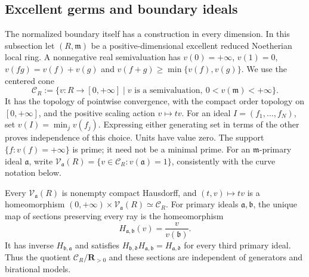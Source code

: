 \subsection{Excellent germs and boundary ideals}
\label{sec:local-excellent-boundary-links}

The normalized boundary itself has a construction in every dimension.
In this subsection let $(R,\mathfrak m)$ be a positive-dimensional
excellent reduced Noetherian local ring. A nonnegative real semivaluation
has $v(0)=+\infty$, $v(1)=0$, $v(fg)=v(f)+v(g)$ and
$v(f+g)\geq\min\{v(f),v(g)\}$. We use the centered cone
\[
 \mathcal C_R
   :=\{v:R\longrightarrow[0,+\infty]\mid
          v\text{ is a semivaluation},\ 0<v(\mathfrak m)<+\infty\}.
\]
It has the topology of pointwise convergence, with the compact order
topology on $[0,+\infty]$, and the positive scaling action $v\mapsto tv$.
For an ideal $I=(f_1,\ldots,f_N)$, set $v(I)=\min_jv(f_j)$.
Expressing either generating set in terms of the other proves independence
of this choice. Units have value zero. The support
$\{f:v(f)=+\infty\}$ is prime; it need not be a minimal prime.
For an $\mathfrak m$-primary ideal $\mathfrak a$, write
$\mathcal V_{\mathfrak a}(R)=\{v\in\mathcal C_R:v(\mathfrak a)=1\}$,
consistently with the curve notation below.

\begin{theorem}\label{thm:p121-excellent-primary-links}
Every $\mathcal V_{\mathfrak a}(R)$ is nonempty compact Hausdorff,
and $(t,v)\mapsto tv$ is a homeomorphism
$(0,+\infty)\times\mathcal V_{\mathfrak a}(R)\simeq\mathcal C_R$.
For primary ideals $\mathfrak a,\mathfrak b$, the unique map of
sections preserving every ray is the homeomorphism
\begin{equation}\label{eq:p121-general-boundary-change}
 H_{\mathfrak a,\mathfrak b}(v)=\frac{v}{v(\mathfrak b)}.
\tag{70.7a}
\end{equation}
It has inverse $H_{\mathfrak b,\mathfrak a}$ and satisfies
$H_{\mathfrak b,\mathfrak d}H_{\mathfrak a,\mathfrak b}
=H_{\mathfrak a,\mathfrak d}$ for every third primary ideal.
Thus the quotient $\mathcal C_R/\mathbf R_{>0}$ and these sections
are independent of generators and birational models.
\end{theorem}


